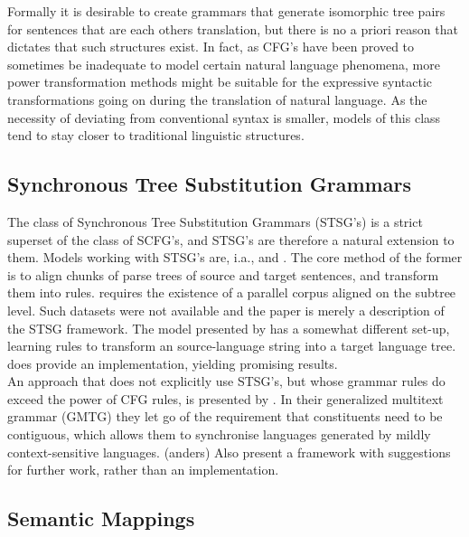 \documentclass{report}
\theoremstyle{definition}
\theoremstyle{plain}
\begin{document}
Formally it is desirable to create grammars that generate isomorphic tree pairs for sentences that are each others translation, but there is no a priori reason that dictates that such structures exist. In fact, as CFG's have been proved to sometimes be inadequate to model certain natural language phenomena, more power transformation methods might be suitable for the expressive syntactic transformations going on during the translation of natural language. As the necessity of deviating from conventional syntax is smaller, models of this class tend to stay closer to traditional linguistic structures.

\subsection{Synchronous Tree Substitution Grammars}

The class of Synchronous Tree Substitution Grammars (STSG's) is a strict superset of the class of SCFG's, and STSG's are therefore a natural extension to them. Models working with STSG's are, i.a., \cite{poutsma2000data} and \cite{galley2004s,galley2006scalable}. The core method of the former is to align chunks of parse trees of source and target sentences, and transform them into rules. \cite{poutsma2000data} requires the existence of a parallel corpus aligned on the subtree level. Such datasets were not available and the paper is merely a description of the STSG framework.  The model presented by \citeauthor{galley2004s} has a somewhat different set-up, learning rules to transform an source-language string into a target language tree. \cite{galley2006scalable} does provide an implementation, yielding promising results.\\
An approach that does not explicitly use STSG's, but whose grammar rules do exceed the power of CFG rules, is presented by \cite{melamed2004generalized}. In their generalized multitext grammar (GMTG) they let go of the requirement that constituents need to be contiguous, which allows them to synchronise languages generated by mildly context-sensitive languages. (anders) Also \citeauthor{melamed2004generalized} present a framework with suggestions for further work, rather than an implementation.

\subsection{Semantic Mappings}
\end{document}
